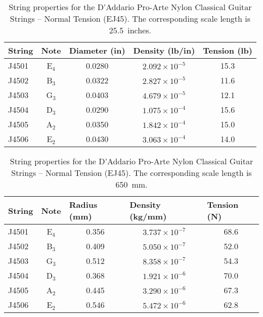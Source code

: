 \begin{table}[htbp]
  \centering
  \caption{\label{tbl:ej45_ips} String properties for the D'Addario Pro-Arte Nylon Classical Guitar Strings -- Normal Tension (EJ45). The corresponding scale length is 25.5~inches.}
    \begin{tabular}{lcccc}
    \hline \hline
    String  & Note  & \multicolumn{1}{l}{Diameter (in)} & \multicolumn{1}{l}{Density (lb/in)} & \multicolumn{1}{l}{Tension (lb)} \\
    \hline
    J4501 & E$_4$  & 0.0280 & $2.092 \times 10^{-5}$ & 15.3 \\
    J4502 & B$_3$  & 0.0322 & $2.827 \times 10^{-5}$ & 11.6 \\
    J4503 & G$_3$  & 0.0403 & $4.679 \times 10^{-5}$ & 12.1 \\
    J4504 & D$_3$  & 0.0290 & $1.075 \times 10^{-4}$ & 15.6 \\
    J4505 & A$_2$  & 0.0350 & $1.842 \times 10^{-4}$ & 15.0 \\
    J4506 & E$_2$  & 0.0430 & $3.063 \times 10^{-4}$ & 14.0 \\
    \hline
    \end{tabular}%
  \label{tab:addlabel}%
\end{table}%

\begin{table}[htbp]
  \centering
  \caption{\label{tbl:ej45_mks} String properties for the D'Addario Pro-Arte Nylon Classical Guitar Strings -- Normal Tension (EJ45). The corresponding scale length is 650~mm.}
    \begin{tabular}{lcccc}
    \hline \hline
    String  & Note  & \multicolumn{1}{l}{Radius (mm)} & \multicolumn{1}{l}{Density (kg/mm)} & \multicolumn{1}{l}{Tension (N)} \\
    \hline
    J4501 & E$_4$  & 0.356 & $3.737 \times 10^{-7}$ & 68.6 \\
    J4502 & B$_3$  & 0.409 & $5.050 \times 10^{-7}$ & 52.0 \\
    J4503 & G$_3$  & 0.512 & $8.358 \times 10^{-7}$ & 54.3 \\
    J4504 & D$_3$  & 0.368 & $1.921 \times 10^{-6}$ & 70.0 \\
    J4505 & A$_2$  & 0.445 & $3.290 \times 10^{-6}$ & 67.3 \\
    J4506 & E$_2$  & 0.546 & $5.472 \times 10^{-6}$ & 62.8 \\
    \hline
    \end{tabular}%
  \label{tab:addlabel}%
\end{table}%



